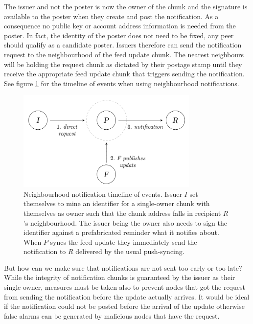 The issuer and not the poster is now the owner of the chunk and the signature is available to the poster when they create and post the notification. As a consequence no public key or account address information is needed from the poster. In fact, the identity of the poster does not need to be fixed, any peer should qualify as a candidate poster. Issuers therefore can send the notification request to the neighbourhood of the feed update chunk. The nearest neighbours will be holding the request chunk as dictated by their postage stamp until they receive the appropriate feed update chunk that triggers sending the notification. See figure \ref{fig:neighbourhood-notification-events} for the timeline of events when using neighbourhood notifications.

\begin{figure}[htbp]
\centering
\includegraphics[width=0.8\textwidth]{fig/neighbourhood-notification-events.pdf}
\caption[Neighbourhood notification timeline of events \statusgreen]{Neighbourhood notification timeline of events. Issuer $I$ set themselves to mine an identifier for a single-owner chunk with themselves as owner such that the chunk address falls in recipient $R$'s neighbourhood. The issuer being the owner also needs to sign the identifier against a prefabricated reminder what it notifies about. When $P$ syncs the feed update they immediately send the notification to $R$ delivered by the usual push-syncing.}
\label{fig:neighbourhood-notification-events}
\end{figure}
  

But how can we make sure that notifications are not sent too early or too late? While the integrity of notification chunks is guaranteed by the issuer as their single-owner, measures must be taken  also to prevent nodes that got the request from sending the notification before the update actually arrives. It would be ideal if the notification could not be posted before the arrival of the update otherwise false alarms can be generated by malicious nodes that have the request.


